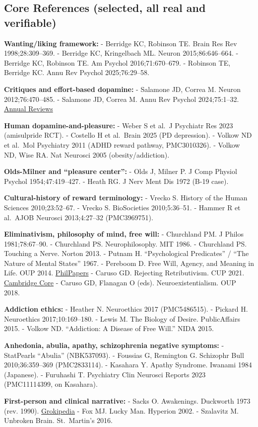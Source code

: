 \subsection{Core References (selected, all real and verifiable)}\label{07_pleasure_and_self-core-references-selected-all-real-and-verifiable}

\textbf{Wanting/liking framework:} - Berridge KC, Robinson TE. Brain Res Rev 1998;28:309--369. - Berridge KC, Kringelbach ML. Neuron 2015;86:646--664. - Berridge KC, Robinson TE. Am Psychol 2016;71:670--679. - Robinson TE, Berridge KC. Annu Rev Psychol 2025;76:29--58.

\textbf{Critiques and effort-based dopamine:} - Salamone JD, Correa M. Neuron 2012;76:470--485. - Salamone JD, Correa M. Annu Rev Psychol 2024;75:1--32. \href{https://www.annualreviews.org/content/journals/10.1146/annurev-psych-020223-012208}{Annual Reviews}

\textbf{Human dopamine-and-pleasure:} - Weber S et al.~J Psychiatr Res 2023 (amisulpride RCT). - Costello H et al.~Brain 2025 (PD depression). - Volkow ND et al.~Mol Psychiatry 2011 (ADHD reward pathway, PMC3010326). - Volkow ND, Wise RA. Nat Neurosci 2005 (obesity/addiction).

\textbf{Olds-Milner and ``pleasure center'':} - Olds J, Milner P. J Comp Physiol Psychol 1954;47:419--427. - Heath RG. J Nerv Ment Dis 1972 (B-19 case).

\textbf{Cultural-history of reward terminology:} - Vrecko S. History of the Human Sciences 2010;23:52--67. - Vrecko S. BioSocieties 2010;5:36--51. - Hammer R et al.~AJOB Neurosci 2013;4:27--32 (PMC3969751).

\textbf{Eliminativism, philosophy of mind, free will:} - Churchland PM. J Philos 1981;78:67--90. - Churchland PS. Neurophilosophy. MIT 1986. - Churchland PS. Touching a Nerve. Norton 2013. - Putnam H. ``Psychological Predicates'' / ``The Nature of Mental States'' 1967. - Pereboom D. Free Will, Agency, and Meaning in Life. OUP 2014. \href{https://philpapers.org/rec/CARPOD-2}{PhilPapers} - Caruso GD. Rejecting Retributivism. CUP 2021. \href{https://www.cambridge.org/core/books/moral-responsibility-reconsidered/0DD200C8E84E6458EA56A098BC7E206F}{Cambridge Core} - Caruso GD, Flanagan O (eds). Neuroexistentialism. OUP 2018.

\textbf{Addiction ethics:} - Heather N. Neuroethics 2017 (PMC5486515). - Pickard H. Neuroethics 2017;10:169--180. - Lewis M. The Biology of Desire. PublicAffairs 2015. - Volkow ND. ``Addiction: A Disease of Free Will.'' NIDA 2015.

\textbf{Anhedonia, abulia, apathy, schizophrenia negative symptoms:} - StatPearls ``Abulia'' (NBK537093). - Foussias G, Remington G. Schizophr Bull 2010;36:359--369 (PMC2833114). - Kasahara Y. Apathy Syndrome. Iwanami 1984 (Japanese). - Furuhashi T. Psychiatry Clin Neurosci Reports 2023 (PMC11114399, on Kasahara).

\textbf{First-person and clinical narrative:} - Sacks O. Awakenings. Duckworth 1973 (rev. 1990). \href{https://grokipedia.com/page/Awakenings_(book)}{Grokipedia} - Fox MJ. Lucky Man. Hyperion 2002. - Szalavitz M. Unbroken Brain. St.~Martin's 2016.
